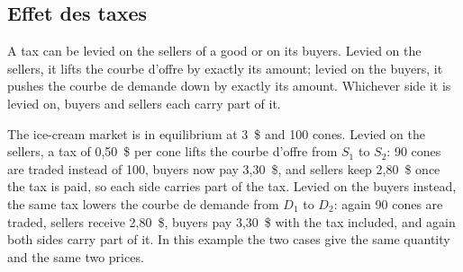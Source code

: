 \subsection{Effet des taxes}

A tax can be levied on the sellers of a good or on its buyers. Levied on the
sellers, it lifts the courbe d'offre by exactly its amount; levied on the buyers, it
pushes the courbe de demande down by exactly its amount. Whichever side it is
levied on, buyers and sellers each carry part of it.

\begin{example}
  The ice-cream market is in equilibrium at 3~\$ and 100 cones. Levied on the
  sellers, a tax of 0,50~\$ per cone lifts the courbe d'offre from $S_1$ to $S_2$:
  90 cones are traded instead of 100, buyers now pay 3,30~\$, and sellers keep
  2,80~\$ once the tax is paid, so each side carries part of the tax. Levied on the
  buyers instead, the same tax lowers the courbe de demande from $D_1$ to $D_2$:
  again 90 cones are traded, sellers receive 2,80~\$, buyers pay 3,30~\$ with the
  tax included, and again both sides carry part of it. In this example the two
  cases give the same quantity and the same two prices.
\end{example}

